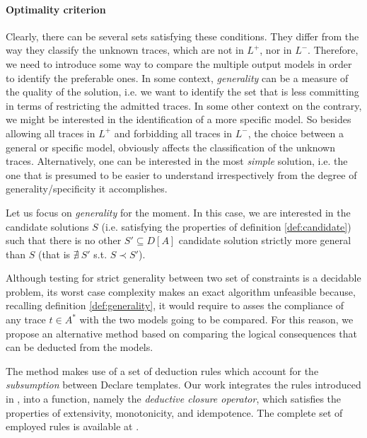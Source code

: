 \paragraph{Optimality criterion} Clearly, there can be several sets satisfying these conditions. They differ from the way they classify the unknown traces, which are not in $L^+$, nor in $L^-$. Therefore, we need to introduce some way to compare the multiple output models in order to identify the preferable ones.
%
In some context, \emph{generality} can be a measure of the quality of the solution, i.e. we want to identify the set that is less committing in terms of restricting the admitted traces. In some other context on the contrary, we might be interested in the identification of a more specific model. So besides allowing all traces in $L^+$ and forbidding all traces in $L^-$, the choice between a general or specific model, obviously affects the classification of the unknown traces. Alternatively, one can be interested in the most \emph{simple} solution, i.e. the one that is presumed to be easier to understand irrespectively from the degree of generality/specificity it accomplishes.

Let us focus on \emph{generality} for the moment. In this case, we are interested in the candidate solutions $S$ (i.e. satisfying the properties of definition \ref{def:candidate}) such that there is no other $S'\subseteq D[A]$ candidate solution strictly more general than $S$ (that is $\nexists~ S'$ s.t. $S\prec S'$).


Although testing for strict generality between two set of constraints is a decidable problem, its worst case complexity makes an exact algorithm unfeasible because, recalling definition \ref{def:generality}, it would require to asses the compliance of any trace $t \in A^*$ with the two models going to be compared.
For this reason, we propose an alternative method based on comparing the logical consequences that can be deducted from the models.

The method makes use of a set of deduction rules which account for the \emph{subsumption} between Declare templates. 
Our work integrates the rules introduced in \cite{2017-DiCiccio}, into a function, namely the \emph{deductive closure operator}, which satisfies the properties of extensivity, monotonicity, and idempotence. The complete set of employed rules is available at \cite{?}. 


